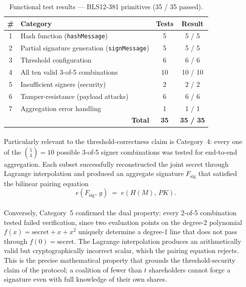 \begin{table}[H]
  \centering
  \caption{Functional test results --- BLS12-381 primitives (35 / 35 passed).}
  \label{tab:functional}
  \begin{tabular}{|c|l|c|c|}
    \hline
    \# & Category & Tests & Result \\\hline
    1 & Hash function (\texttt{hashMessage}) & 5 & 5 / 5 \\\hline
    2 & Partial signature generation (\texttt{signMessage}) & 5 & 5 / 5 \\\hline
    3 & Threshold configuration & 6 & 6 / 6 \\\hline
    4 & All ten valid 3-of-5 combinations & 10 & 10 / 10 \\\hline
    5 & Insufficient signers (security) & 2 & 2 / 2 \\\hline
    6 & Tamper-resistance (payload attacks) & 6 & 6 / 6 \\\hline
    7 & Aggregation error handling & 1 & 1 / 1 \\\hline
    \multicolumn{2}{|r|}{\textbf{Total}} & \textbf{35} & \textbf{35 / 35} \\\hline
  \end{tabular}
\end{table}

\paragraph{}Particularly relevant to the threshold-correctness claim is Category~4: every one of the $\binom{5}{3} = 10$ possible 3-of-5 signer combinations was tested for end-to-end aggregation. Each subset successfully reconstructed the joint secret through Lagrange interpolation and produced an aggregate signature $F_{\text{sig}}$ that satisfied the bilinear pairing equation
\[
e(F_{\text{sig}},\, g) \;=\; e(H(M),\, PK).
\]

\paragraph{}Conversely, Category~5 confirmed the dual property: every 2-of-5 combination tested failed verification, since two evaluation points on the degree-2 polynomial $f(x) = \text{secret} + x + x^2$ uniquely determine a degree-1 line that does not pass through $f(0) = \text{secret}$. The Lagrange interpolation produces an arithmetically valid but cryptographically incorrect scalar, which the pairing equation rejects. This is the precise mathematical property that grounds the threshold-security claim of the protocol; a coalition of fewer than $t$ shareholders cannot forge a signature even with full knowledge of their own shares.

